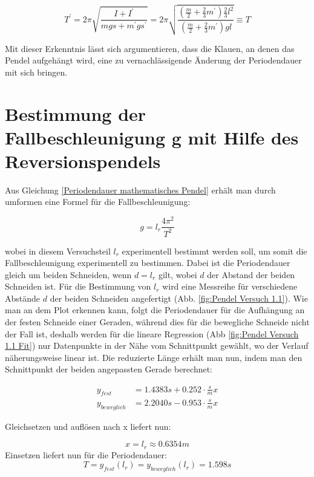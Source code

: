 \begin{equation}
    T^\prime = 2 \pi \sqrt{\frac{I + I^\prime}{mgs+m^\prime g s^\prime }} = 2\pi \sqrt{ \frac{ (\frac{m}{2} + \frac{2}{3} m^\prime) \frac{2}{3}l^2} { (\frac{m}{2} + \frac{2}{3}m^\prime)g l  }} \equiv T
\end{equation}

Mit dieser Erkenntnis lässt sich argumentieren, dass die Klauen, an denen das Pendel aufgehängt wird, eine zu vernachlässigende Änderung der Periodendauer mit sich bringen.

\section{Bestimmung der Fallbeschleunigung g mit Hilfe des Reversionspendels}

Aus Gleichung \ref{Periodendauer mathematisches Pendel} erhält man durch umformen eine Formel für die Fallbeschleunigung: 

\begin{equation} \label{Fallbeschleunigung mathematisches Pendel}
    g = l_r \frac{4 \pi^2}{T^2}
\end{equation}

wobei in diesem Versuchsteil $l_r$ experimentell bestimmt werden soll, um somit die Fallbeschleunigung experimentell zu bestimmen. Dabei ist die Periodendauer gleich um beiden Schneiden, wenn $d = l_r$ gilt, wobei $d$ der Abstand der beiden Schneiden ist. Für die Bestimmung von $l_r$ wird eine Messreihe für verschiedene Abstände $d$ der beiden Schneiden angefertigt (Abb. \ref{fig:Pendel Versuch 1.1}). Wie man an dem Plot erkennen kann, folgt die Periodendauer für die Aufhängung an der festen Schneide einer Geraden, während dies für die bewegliche Schneide nicht der Fall ist, deshalb werden für die lineare Regression (Abb \ref{fig:Pendel Versuch 1.1 Fit}) nur Datenpunkte in der Nähe vom Schnittpunkt gewählt, wo der Verlauf näherungsweise linear ist. Die reduzierte Länge erhält man nun, indem man den Schnittpunkt der beiden angepassten Gerade berechnet:

\begin{align} 
    \nonumber y_{fest} &=  1.4383s + 0.252 \cdot \frac{s}{m} x\\
    \nonumber y_{beweglich} &= 2.2040s -0.953 \cdot \frac{s}{m} x
\end{align}

Gleichsetzen und auflösen nach x liefert nun:

    $$x=l_r \approx 0.6354m $$
    Einsetzen liefert nun für die Periodendauer:
    $$T = y_{fest}(l_r) = y_{beweglich}(l_r) = 1.598 s$$

